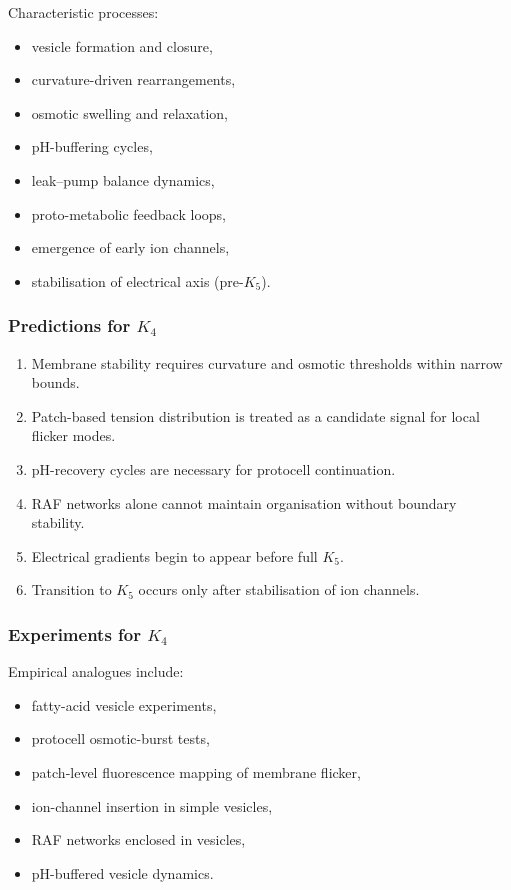 Characteristic processes:
\begin{itemize}
    \item vesicle formation and closure,
    \item curvature-driven rearrangements,
    \item osmotic swelling and relaxation,
    \item pH-buffering cycles,
    \item leak–pump balance dynamics,
    \item proto-metabolic feedback loops,
    \item emergence of early ion channels,
    \item stabilisation of electrical axis (pre-$K_5$).
\end{itemize}

\subsubsection{Predictions for \texorpdfstring{$K_4$}{K_4}}

\begin{enumerate}
    \item Membrane stability requires curvature and osmotic thresholds
          within narrow bounds.
    \item Patch-based tension distribution is treated as a candidate signal for local flicker modes.
    \item pH-recovery cycles are necessary for protocell continuation.
    \item RAF networks alone cannot maintain organisation without
          boundary stability.
    \item Electrical gradients begin to appear before full $K_5$.
    \item Transition to $K_5$ occurs only after stabilisation of ion
          channels.
\end{enumerate}

\subsubsection{Experiments for \texorpdfstring{$K_4$}{K_4}}

Empirical analogues include:
\begin{itemize}
    \item fatty-acid vesicle experiments,
    \item protocell osmotic-burst tests,
    \item patch-level fluorescence mapping of membrane flicker,
    \item ion-channel insertion in simple vesicles,
    \item RAF networks enclosed in vesicles,
    \item pH-buffered vesicle dynamics.
\end{itemize}


